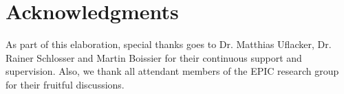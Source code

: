 \documentclass{sig-alternate-05-2015}
\begin{document}


\section*{Acknowledgments}
As part of this elaboration, special thanks goes to Dr. Matthias Uflacker, Dr. Rainer Schlosser and Martin Boissier for their continuous support and supervision. Also, we thank all attendant members of the EPIC research group for their fruitful discussions.



  
\end{document}
